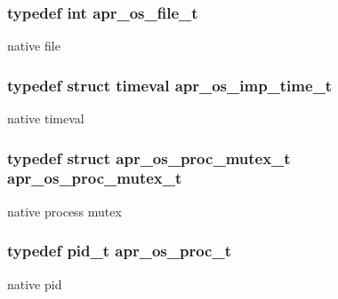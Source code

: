 \subsubsection[{\texorpdfstring{apr\+\_\+os\+\_\+file\+\_\+t}{apr_os_file_t}}]{\setlength{\rightskip}{0pt plus 5cm}typedef int {\bf apr\+\_\+os\+\_\+file\+\_\+t}}\hypertarget{group__apr__portabile_ga885491b889a4a719549650d3a370fd34}{}\label{group__apr__portabile_ga885491b889a4a719549650d3a370fd34}
native file 
\subsubsection[{\texorpdfstring{apr\+\_\+os\+\_\+imp\+\_\+time\+\_\+t}{apr_os_imp_time_t}}]{\setlength{\rightskip}{0pt plus 5cm}typedef struct timeval {\bf apr\+\_\+os\+\_\+imp\+\_\+time\+\_\+t}}\hypertarget{group__apr__portabile_ga6d27e476300cd1d3fda24e1ff0e358e1}{}\label{group__apr__portabile_ga6d27e476300cd1d3fda24e1ff0e358e1}
native timeval 
\subsubsection[{\texorpdfstring{apr\+\_\+os\+\_\+proc\+\_\+mutex\+\_\+t}{apr_os_proc_mutex_t}}]{\setlength{\rightskip}{0pt plus 5cm}typedef struct {\bf apr\+\_\+os\+\_\+proc\+\_\+mutex\+\_\+t} {\bf apr\+\_\+os\+\_\+proc\+\_\+mutex\+\_\+t}}\hypertarget{group__apr__portabile_ga107413a26e947456cabfcab99b8a7ade}{}\label{group__apr__portabile_ga107413a26e947456cabfcab99b8a7ade}
native process mutex 
\subsubsection[{\texorpdfstring{apr\+\_\+os\+\_\+proc\+\_\+t}{apr_os_proc_t}}]{\setlength{\rightskip}{0pt plus 5cm}typedef pid\+\_\+t {\bf apr\+\_\+os\+\_\+proc\+\_\+t}}\hypertarget{group__apr__portabile_ga2ce5962de629ee6528081813c6b60e2e}{}\label{group__apr__portabile_ga2ce5962de629ee6528081813c6b60e2e}
native pid 

